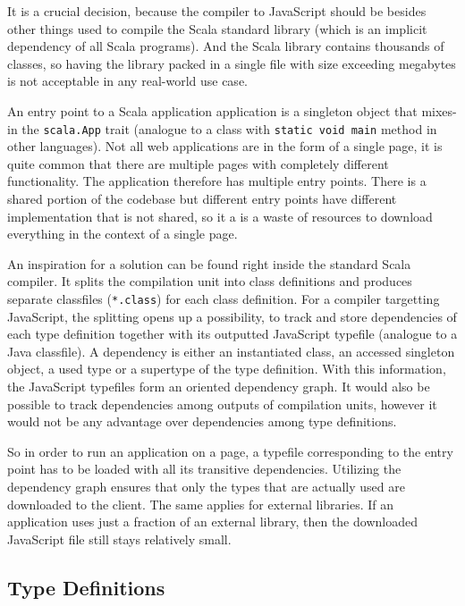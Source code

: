 \documentclass[12pt,a4paper]{report}
\begin{document}
It is a crucial decision, because the compiler to JavaScript should be besides other things used to compile the Scala standard library\cite{ScalaLibrary} (which is an implicit dependency of all Scala programs). And the Scala library contains thousands of classes, so having the library packed in a single file with size exceeding megabytes is not acceptable in any real-world use case.

An entry point to a Scala application application is a singleton object that mixes-in the \texttt{scala.App} trait (analogue to a class with \texttt{static void main} method in other languages). Not all web applications are in the form of a single page, it is quite common that there are multiple pages with completely different functionality. The application therefore has multiple entry points. There is a shared portion of the codebase but different entry points have different implementation that is not shared, so it a is a waste of resources to download everything in the context of a single page.

An inspiration for a solution can be found right inside the standard Scala compiler. It splits the compilation unit into class definitions and produces separate classfiles (\texttt{*.class}) for each class definition. For a compiler targetting JavaScript, the splitting opens up a possibility, to track and store dependencies of each type definition together with its outputted JavaScript typefile (analogue to a Java classfile). A dependency is either an instantiated class, an accessed singleton object, a used type or a supertype of the type definition. With this information, the JavaScript typefiles form an oriented dependency graph. It would also be possible to track dependencies among outputs of compilation units, however it would not be any advantage over dependencies among type definitions.

So in order to run an application on a page, a typefile corresponding to the entry point has to be loaded with all its transitive dependencies. Utilizing the dependency graph ensures that only the types that are actually used are downloaded to the client. The same applies for external libraries. If an application uses just a fraction of an external library, then the downloaded JavaScript file still stays relatively small.

\subsection{Type Definitions}
\end{document}
